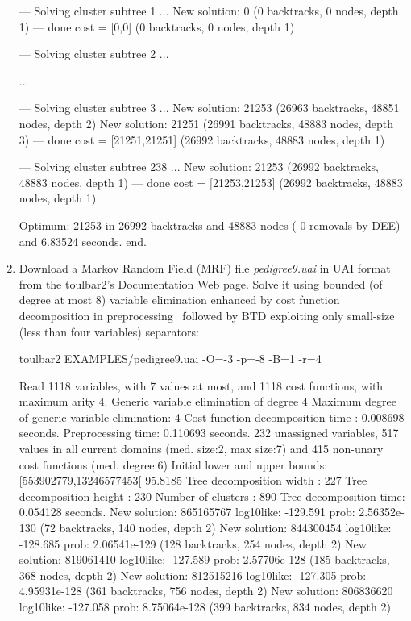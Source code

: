 \begin{enumerate}
{\begin{DoxyCode}
--- Solving cluster subtree 1 ...
New solution: 0 (0 backtracks, 0 nodes, depth 1)
---  done  cost = [0,0] (0 backtracks, 0 nodes, depth 1)

--- Solving cluster subtree 2 ...

...

--- Solving cluster subtree 3 ...
New solution: 21253 (26963 backtracks, 48851 nodes, depth 2)
New solution: 21251 (26991 backtracks, 48883 nodes, depth 3)
---  done  cost = [21251,21251] (26992 backtracks, 48883 nodes, depth 1)

--- Solving cluster subtree 238 ...
New solution: 21253 (26992 backtracks, 48883 nodes, depth 1)
---  done  cost = [21253,21253] (26992 backtracks, 48883 nodes, depth 1)

Optimum: 21253 in 26992 backtracks and 48883 nodes ( 0 removals by DEE) and 6.83524 seconds.
end.
\end{DoxyCode}}
\item Download a Markov Random Field (MRF) file {\em pedigree9.uai} in UAI format from the toulbar2's Documentation Web page. Solve it using bounded (of degree at most 8) variable elimination enhanced by cost function decomposition in preprocessing~\cite{Favier11a} followed by BTD exploiting only small-size (less than four variables) separators:
\begin{DoxyCode}
	toulbar2 EXAMPLES/pedigree9.uai -O=-3 -p=-8 -B=1 -r=4
\end{DoxyCode}
{\scriptsize
\begin{DoxyCode}
Read 1118 variables, with 7 values at most, and 1118 cost functions, with maximum arity 4.
Generic variable elimination of degree 4
Maximum degree of generic variable elimination: 4
Cost function decomposition time : 0.008698 seconds.
Preprocessing time: 0.110693 seconds.
232 unassigned variables, 517 values in all current domains (med. size:2, max size:7) and 415 non-unary cost functions (med. degree:6)
Initial lower and upper bounds: [553902779,13246577453[ 95.8185%
Tree decomposition width  : 227
Tree decomposition height : 230
Number of clusters        : 890
Tree decomposition time: 0.054128 seconds.
New solution: 865165767 log10like: -129.591 prob: 2.56352e-130 (72 backtracks, 140 nodes, depth 2)
New solution: 844300454 log10like: -128.685 prob: 2.06541e-129 (128 backtracks, 254 nodes, depth 2)
New solution: 819061410 log10like: -127.589 prob: 2.57706e-128 (185 backtracks, 368 nodes, depth 2)
New solution: 812515216 log10like: -127.305 prob: 4.95931e-128 (361 backtracks, 756 nodes, depth 2)
New solution: 806836620 log10like: -127.058 prob: 8.75064e-128 (399 backtracks, 834 nodes, depth 2)

\end{DoxyCode}}
\end{enumerate}
